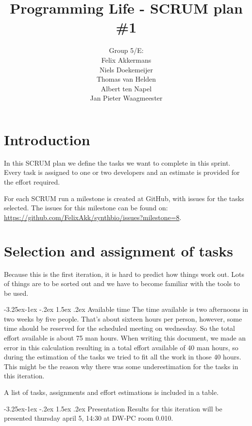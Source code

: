 \documentclass[a4paper]{article}
\title{Programming Life - SCRUM plan \#1}
\author{Group 5/E:\\
Felix Akkermans \\
Niels Doekemeijer \\
Thomas van Helden \\
Albert ten Napel \\
Jan Pieter Waagmeester}
\makeatletter
\renewcommand\paragraph{\@startsection{paragraph}{4}{\z@}%
  {-3.25ex\@plus -1ex \@minus -.2ex}%
  {1.5ex \@plus .2ex}%
  {\normalfont\normalsize\bfseries}}
\newcommand{\githubmilestone}[1]{\url{https://github.com/FelixAkk/synthbio/issues?milestone=#1}}
\makeatother
\begin{document}
\maketitle

\section{Introduction}
In this SCRUM plan we define the tasks we want to complete in this sprint. Every task is assigned to one or two developers and an estimate is provided for the effort required.

For each SCRUM run a milestone is created at GitHub, with issues for the tasks selected. The issues for this milestone can be found on: \githubmilestone{8}.

\section{Selection and assignment of tasks}
Because this is the first iteration, it is hard to predict how things work out. Lots of things are to be sorted out and we have to become familiar with the tools to be used.

\paragraph{Available time}
The time available is two afternoons in two weeks by five people. That's about sixteen hours per person, however, some time should be reserved for the scheduled meeting on wednesday. So the total effort available is about 75 man hours. When writing this document, we made an error in this calculation resulting in a total effort available of 40 man hours, so during the estimation of the tasks we tried to fit all the work in those 40 hours. This might be the reason why there was some underestimation for the tasks in this iteration.

A list of tasks, assignments and effort estimations is included in a table.


\paragraph{Presentation}
Results for this iteration will be presented thursday april 5, 14:30 at DW-PC room 0.010.
\end{document}
